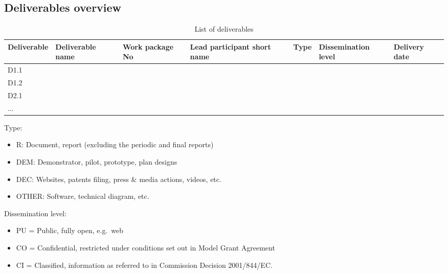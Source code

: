 \documentclass[11pt,a4paper]{report}
\begin{document}
\subsection{Deliverables overview}\label{deliverables-overview}

\begin{table}[!htbp]
\caption{List of deliverables}
\begin{tabular}{@{}lllllll@{}}
\toprule
\textbf{Deliverable} & \textbf{Deliverable name} & \textbf{Work package No} & \textbf{Lead participant short name} & \textbf{Type} & \textbf{Dissemination level} & \textbf{Delivery date} \\ \midrule
D1.1                 &                           &                          &                                      &               &                              &                        \\
D1.2                 &                           &                          &                                      &               &                              &                        \\
D2.1                 &                           &                          &                                      &               &                              &                        \\
...                  &                           &                          &                                      &               &                              &                        \\ \bottomrule
\end{tabular}
\end{table}

Type:

\begin{itemize}

\item   R: Document, report (excluding the periodic and final reports)
\item   DEM: Demonstrator, pilot, prototype, plan designs
\item   DEC: Websites, patents filing, press \& media actions, videos, etc.
\item   OTHER: Software, technical diagram, etc.
\end{itemize}

Dissemination level:

\begin{itemize}

\item   PU = Public, fully open, e.g.~web
\item   CO = Confidential, restricted under conditions set out in Model Grant
  Agreement
\item   CI = Classified, information as referred to in Commission Decision
  2001/844/EC.
\end{itemize}
\end{document}
